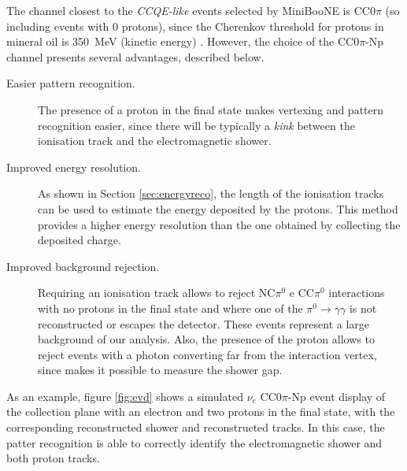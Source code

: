 The channel closest to the \emph{CCQE-like} events selected by MiniBooNE is CC0$\pi$ (so including events with 0 protons), since the Cherenkov threshold for protons in mineral oil is 350~MeV (kinetic energy) \cite{Perevalov:2009mn}.
However, the choice of the CC0$\pi$-Np channel presents several advantages, described below.
\begin{description}
    \item[Easier pattern recognition.] The presence of a proton in the final state makes vertexing and pattern recognition easier, since there will be typically a \emph{kink} between the ionisation track and the electromagnetic shower.
    \item[Improved energy resolution.] As shown in Section \ref{sec:energyreco}, the length of the ionisation tracks can be used to estimate the energy deposited by the protons. This method provides a higher energy resolution than the one obtained by collecting the deposited charge.
    \item[Improved background rejection.] Requiring an ionisation track allows to reject NC$\pi^0$ e CC$\pi^0$ interactions with no protons in the final state and where one of the $\pi^0\rightarrow\gamma\gamma$ is not reconstructed or escapes the detector. These events represent a large background of our analysis. Also, the presence of the proton allows to reject events with a photon converting far from the interaction vertex, since makes it possible to measure the shower gap.
\end{description}


As an example, figure \ref{fig:evd} shows a simulated $\nu_{e}$ CC0$\pi$-Np event display of the collection plane with an electron and two protons in the final state, with the corresponding reconstructed shower and reconstructed tracks. In this case, the patter recognition is able to correctly identify the electromagnetic shower and both proton tracks.


